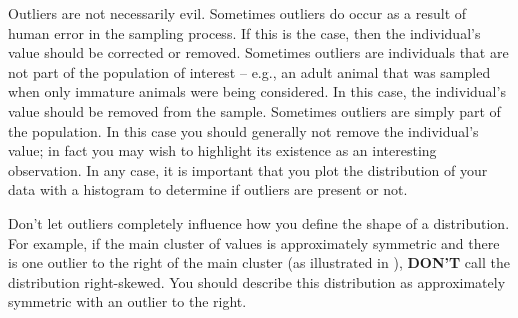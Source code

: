 \documentclass[10pt,openany]{book}\usepackage[]{graphicx}\usepackage[]{color}
\begin{document}
\vspace{-12pt}

Outliers are not necessarily evil.  Sometimes outliers do occur as a result of human error in the sampling process.  If this is the case, then the individual's value should be corrected or removed.  Sometimes outliers are individuals that are not part of the population of interest -- e.g., an adult animal that was sampled when only immature animals were being considered.  In this case, the individual's value should be removed from the sample.  Sometimes outliers are simply part of the population.  In this case you should generally not remove the individual's value; in fact you may wish to highlight its existence as an interesting observation.  In any case, it is important that you plot the distribution of your data with a histogram to determine if outliers are present or not.

Don't let outliers completely influence how you define the shape of a distribution.  For example, if the main cluster of values is approximately symmetric and there is one outlier to the right of the main cluster (as illustrated in ), \textbf{DON'T} call the distribution right-skewed.  You should describe this distribution as approximately symmetric with an outlier to the right.


\vspace{-12pt}
\end{document}
